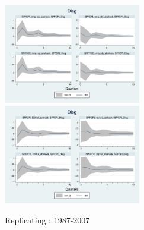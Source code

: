 \documentclass[]{article}
\begin{document}
\begin{figure}[h]
	\smallskip
	\includegraphics[width=6cm]{figures/SPFDisg_ab_ashocks_nmp.png} 
		\includegraphics[width=6cm]{figures/SPFDisg_ab_ashocks.png} 
	\caption{ Replicating \cite{coibion2012can}: 1987-2007}
\end{figure}
\end{document}
